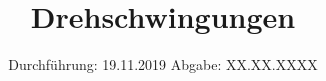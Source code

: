 

\subject{Versuchsnummer: 802}
\title{Drehschwingungen}
\date{%
  Durchführung: 19.11.2019
  \hspace{3em}
  Abgabe: XX.XX.XXXX
}



\maketitle
\thispagestyle{empty}
\tableofcontents
\newpage





\newpage
\printbibliography{}


